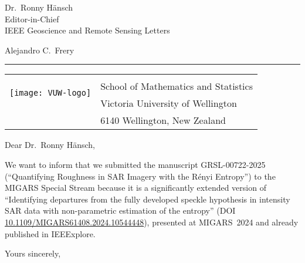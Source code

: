 \documentclass[12pt]{letter} %
\begin{document}
\signature{\texttt{[image: assinatura\_blue-no\_background]}\\
Alejandro C.\ Frery\\
\mbox{Professor of Statistics and Data Science}\\
alejandro.frery@vuw.ac.nz}           %
\longindentation=0pt                       %
\let\raggedleft\raggedright                %
 
\begin{letter}{Dr.\ Ronny Hänsch\\
	Editor-in-Chief\\
	IEEE Geoscience and Remote Sensing Letters}
\date{1 April 2025}

\begin{flushleft}
Alejandro C.\ Frery
\end{flushleft}
\smallskip\hrule height 2pt
\begin{flushright}
\begin{tabular}{rl}
\multirow{3}{*}[20pt]{\texttt{[image: VUW-logo]}}	\\
& \small School of Mathematics and Statistics\\
	& \small Victoria University of Wellington\\
	& \small  6140 Wellington, New Zealand
\end{tabular}
\end{flushright} 
\vfill %

\opening{Dear Dr.\ Ronny Hänsch,} 
 
We want to inform that we submitted the manuscript GRSL-00722-2025 (``Quantifying Roughness in SAR Imagery with the Rényi Entropy'') to the MIGARS Special Stream because it is a significantly extended version of ``Identifying departures from the fully developed speckle hypothesis in intensity SAR data with non-parametric estimation of the entropy'' (DOI \url{10.1109/MIGARS61408.2024.10544448}), presented at MIGARS~2024 and already published in IEEExplore.

\closing{Yours sincerely,} 
  

\end{letter}
\end{document}
